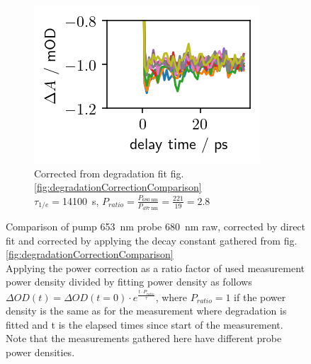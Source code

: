 \documentclass[twoside,openright]{scrreprt}
\begin{document}
\begin{figure}[hbtp]
\begin{subfigure}[t]{0.3215\linewidth}
\includegraphics[width=\columnwidth]{images/PowerVarHigh_CorrEstimate14100_2.8.png} 
\caption{Corrected from degradation fit fig. \ref{fig:degradationCorrectionComparison}\\
$\tau_{1/e}=$\SI{14100}{\second}, $P_{ratio}=\frac{P_{\SI{680}{\nano\meter}}}{P_{\SI{497}{\nano\meter}}} = \frac{221}{19}= 2.8$}
\end{subfigure}
\caption{Comparison of pump \SI{653}{\nano\meter} probe \SI{680}{\nano\meter} raw, corrected by direct fit and corrected by applying the decay constant gathered from fig. \ref{fig:degradationCorrectionComparison}\\Applying the power correction as a ratio factor of used measurement power density divided by fitting power density as follows $\Delta OD(t) = \Delta OD(t=0)\cdot e^{\frac{t\cdot P_{ratio}}{\tau}}$, where $P_{ratio} =1$ if the power density is the same as for the measurement where degradation is fitted and t is the elapsed times since start of the measurement. Note that the measurements gathered here have different probe power densities.\label{fig:powerVarCorrection}}
\end{figure}
\end{document}
